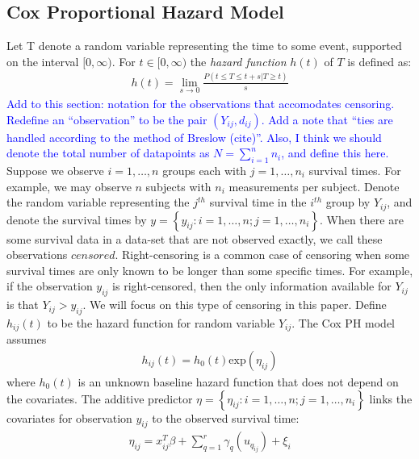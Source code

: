 \documentclass[]{article}
\newcommand{\alex}[1]{\textcolor{blue}{#1}}
\begin{document}
\subsection{Cox Proportional Hazard Model}
Let T denote a random variable representing the time to some event, supported on the interval $[0,\infty)$. For $t\in[0,\infty)$ the \textit{hazard function} $h(t)$ of $T$ is defined as:
\begin{equation}\begin{aligned}\label{eqn:hazard}
h(t) = \lim_{s\to 0} \frac{P(t\le T \le t+s |T\ge t)}{s}
\end{aligned}\end{equation}
\alex{Add to this section: notation for the observations that accomodates censoring. Redefine an ``observation'' to be the pair $(Y_{ij},d_{ij})$. Add a note that ``ties are handled according to the method of Breslow (cite)''. Also, I think we should denote the total number of datapoints as $N = \sum_{i=1}^{n}n_{i}$, and define this here.} Suppose we observe $i = 1,\ldots,n$ groups each with $j = 1,\ldots,n_{i}$ survival times. For example, we may observe $n$ subjects with $n_{i}$ measurements per subject. Denote the random variable representing the $j^{th}$ survival time in the $i^{th}$ group by $Y_{ij}$, and denote the survival times by $y = \left\{y_{ij}: i = 1,\ldots,n; j = 1,\ldots,n_{i} \right\}$. When there are some survival data in a data-set that are not observed exactly, we call these observations $censored$. Right-censoring is a common case of censoring when some survival times are only known to be longer than some specific times. For example, if the observation $y_{ij}$ is right-censored, then the only information available for $Y_{ij}$ is that $Y_{ij} > y_{ij}$. We will focus on this type of censoring in this paper.
Define $h_{ij}(t)$ to be the hazard function for random variable $Y_{ij}$. The Cox PH model assumes \citep{coxph}
\begin{equation}\begin{aligned}\label{eqn:CoxHazardModel}
h_{ij}(t) = h_0(t)\text{exp}(\eta_{ij})
\end{aligned}\end{equation}
where $h_0(t)$ is an unknown baseline hazard function that does not depend on the covariates. The additive predictor $\eta = \left\{ \eta_{ij}: i = 1,\ldots,n; j = 1,\ldots,n_{i}\right\}$ links the covariates for observation $y_{ij}$ to the observed survival time:
\begin{equation}\begin{aligned}\label{eqn:eta}
\eta_{ij} =x_{ij}^{T}\beta+\sum_{q=1}^{r} \gamma_q(u_{q_{ij}}) +\xi_{i}
\end{aligned}\end{equation}
\end{document}
